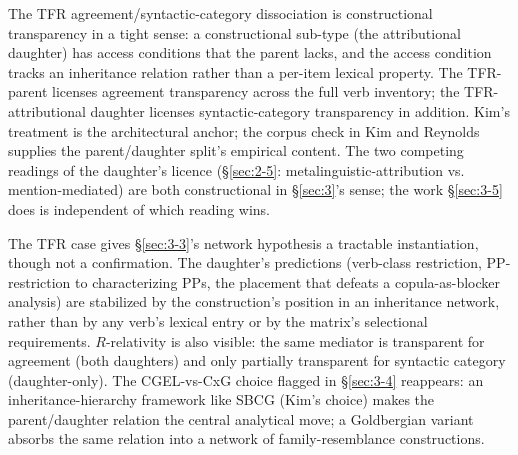 
The TFR agreement/syntactic-category dissociation is constructional transparency in a tight sense: a constructional sub-type (the attributional daughter) has access conditions that the parent lacks, and the access condition tracks an inheritance relation rather than a per-item lexical property. The TFR-parent licenses agreement transparency across the full verb inventory; the TFR-attributional daughter licenses syntactic-category transparency in addition. Kim's \autocite*[ch.~6.8]{kim-2026-form-function} treatment is the architectural anchor; the corpus check in Kim and Reynolds \autocite*{kim-reynolds-2026-tfr-two-kinds} supplies the parent/daughter split's empirical content. The two competing readings of the daughter's licence (§\ref{sec:2-5}: metalinguistic-attribution vs. mention-mediated) are both constructional in §\ref{sec:3}'s sense; the work §\ref{sec:3-5} does is independent of which reading wins.

The TFR case gives §\ref{sec:3-3}'s network hypothesis a tractable instantiation, though not a confirmation. The daughter's predictions (verb-class restriction, PP-restriction to characterizing PPs, the  placement that defeats a copula-as-blocker analysis) are stabilized by the construction's position in an inheritance network, rather than by any verb's lexical entry or by the matrix's selectional requirements. $R$-relativity is also visible: the same mediator is transparent for agreement (both daughters) and only partially transparent for syntactic category (daughter-only). The CGEL-vs-CxG choice flagged in §\ref{sec:3-4} reappears: an inheritance-hierarchy framework like SBCG (Kim's choice) makes the parent/daughter relation the central analytical move; a Goldbergian variant absorbs the same relation into a network of family-resemblance constructions.
